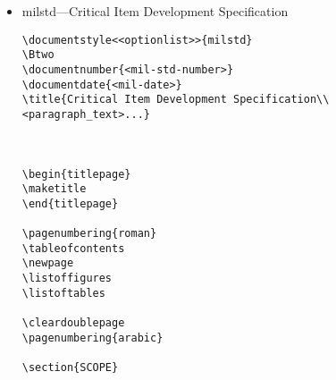 \begin{itemize}
\begin{small}
\begin{verbatim}
\section{PREPARATION FOR DELIVERY}

\section{NOTES}

\appendix
%
% \section will now generate appendices starting with section 10, 20, etc.
%
\section{<text>} % Section 10, Appendix I

\section{<text>} % Section 20, Appendix II


\end{verbatim}
\end{small}

\item milstd---Critical Item Development Specification 

\begin{small}
\begin{verbatim}
\documentstyle<<optionlist>>{milstd}
\Btwo
\documentnumber{<mil-std-number>}
\documentdate{<mil-date>}
\title{Critical Item Development Specification\\
<paragraph_text>...}



\begin{titlepage}
\maketitle
\end{titlepage}

\pagenumbering{roman}
\tableofcontents
\newpage
\listoffigures
\listoftables

\cleardoublepage
\pagenumbering{arabic}

\section{SCOPE}


\end{verbatim}
\end{small}
\end{itemize}
